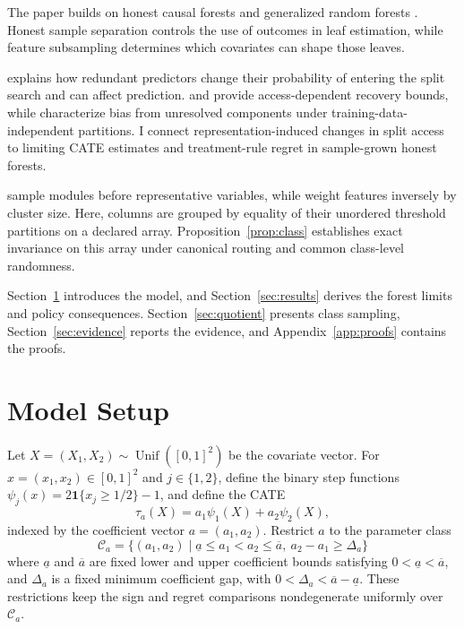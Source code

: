 \documentclass[12pt]{article}
\newcommand{\one}{\mathbf 1}
\begin{document}
The paper builds on honest causal forests \citep{wager2018} and generalized random forests \citep{athey2019}. Honest sample separation controls the use of outcomes in leaf estimation, while feature subsampling determines which covariates can shape those leaves.

\citet{louppe2014} explains how redundant predictors change their probability of entering the split search and can affect prediction. \citet{chi2022high} and \citet{klusowski2024large} provide access-dependent recovery bounds, while \citet{mei2026exogenous} characterize bias from unresolved components under training-data-independent partitions. I connect representation-induced changes in split access to limiting CATE estimates and treatment-rule regret in sample-grown honest forests.

\citet{chen2013module} sample modules before representative variables, while \citet{colot2021} weight features inversely by cluster size. Here, columns are grouped by equality of their unordered threshold partitions on a declared array. Proposition~\ref{prop:class} establishes exact invariance on this array under canonical routing and common class-level randomness.

Section~\ref{sec:model} introduces the model, and Section~\ref{sec:results} derives the forest limits and policy consequences. Section~\ref{sec:quotient} presents class sampling, Section~\ref{sec:evidence} reports the evidence, and Appendix~\ref{app:proofs} contains the proofs.

\section{Model Setup}\label{sec:model}

Let \(X=(X_1,X_2)\sim\operatorname{Unif}([0,1]^2)\) be the covariate vector. For \(x=(x_1,x_2)\in[0,1]^2\) and \(j\in\{1,2\}\), define the binary step functions \(\psi_j(x)=2\one\{x_j\ge1/2\}-1\), and define the CATE
\[
\tau_a(X)=a_1\psi_1(X)+a_2\psi_2(X),
\]
indexed by the coefficient vector \(a=(a_1,a_2)\). Restrict \(a\) to the parameter class
\[
\mathcal C_a=
\{(a_1,a_2)\mid\underline a\le a_1<a_2\le\overline a,
\ a_2-a_1\ge\Delta_a\}
\]
where \(\underline a\) and \(\overline a\) are fixed lower and upper coefficient bounds satisfying \(0<\underline a<\overline a\), and \(\Delta_a\) is a fixed minimum coefficient gap, with \(0<\Delta_a<\overline a-\underline a\). These restrictions keep the sign and regret comparisons nondegenerate uniformly over \(\mathcal C_a\).
\end{document}
